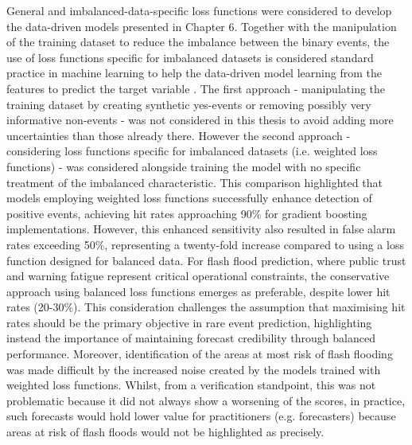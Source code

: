General and imbalanced-data-specific loss functions were considered to develop the data-driven models presented in Chapter 6. Together with the manipulation of the training dataset to reduce the imbalance between the binary events, the use of loss functions specific for imbalanced datasets is considered standard practice in machine learning to help the data-driven model learning from the features to predict the target variable \citep{Altalhan_2025}. The first approach - manipulating the training dataset by creating synthetic yes-events or removing possibly very informative non-events - was not considered in this thesis to avoid adding more uncertainties than those already there. However the second approach - considering loss functions specific for imbalanced datasets (i.e. weighted loss functions) - was considered alongside training the model with no specific treatment of the imbalanced characteristic. This comparison highlighted that models employing weighted loss functions successfully enhance detection of positive events, achieving hit rates approaching 90\% for gradient boosting implementations. However, this enhanced sensitivity also resulted in false alarm rates exceeding 50\%, representing a twenty-fold increase compared to using a loss function designed for balanced data. For flash flood prediction, where public trust and warning fatigue represent critical operational constraints, the conservative approach using balanced loss functions emerges as preferable, despite lower hit rates (20-30\%). This consideration challenges the assumption that maximising hit rates should be the primary objective in rare event prediction, highlighting instead the importance of maintaining forecast credibility through balanced performance. Moreover, identification of the areas at most risk of flash flooding was made difficult by the increased noise created by the models trained with weighted loss functions. Whilst, from a verification standpoint, this was not problematic because it did not always show a worsening of the scores, in practice, such forecasts would hold lower value for practitioners (e.g. forecasters) because areas at risk of flash floods would not be highlighted as precisely. 

